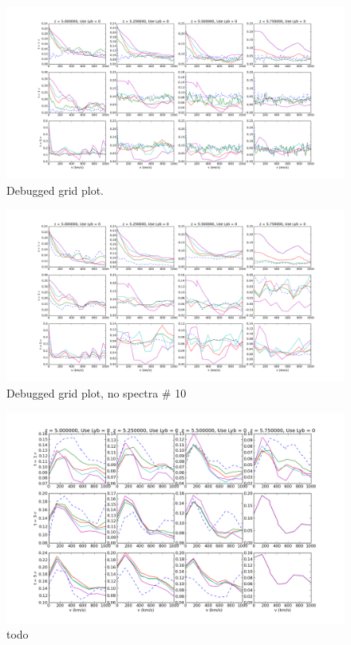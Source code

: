 \documentclass[11pt]{article}
\begin{document}
\begin{figure}[h]
  \centering
  \includegraphics[width=18cm]{GridPlot_Debugged.png}
  \caption{Debugged grid plot.}
  \label{fig:todo}
\end{figure}

\begin{figure}[h]
  \centering
  \includegraphics[width=18cm]{GridPlot_Debugged_No10.png}
  \caption{Debugged grid plot, no spectra \# 10}
  \label{fig:todo}
\end{figure}


\begin{figure}[h]
  \centering
  \includegraphics[width=18cm]{gridPlot_CommonRes.png}
  \caption{todo}
  \label{fig:todo}
\end{figure}
\end{document}
